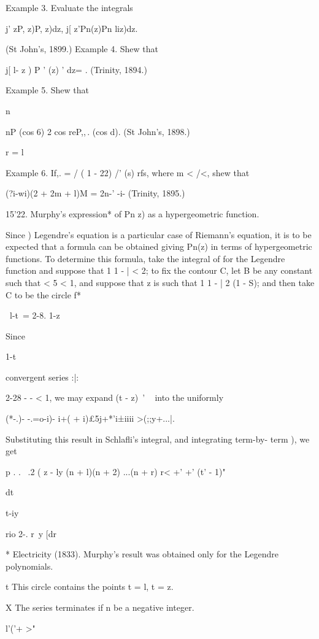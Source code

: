 {{Example 3. Evaluate the integrals

j' zP, z)P, z)dz, j[ z'Pn(z)Pn liz)dz.

(St John's, 1899.) Example 4. Shew that

j[ l- z ) P ' (z) ' dz= . (Trinity, 1894.)

Example 5. Shew that

n

nP (cos 6) 2 cos reP,,\,. (cos d). (St John's, 1898.)

r = l

Example 6. If,. = / ( 1 - 22) /' (s) rfs, where m < /<, shew that

(?i-wi)(2 + 2m + l)M = 2n-' -i- (Trinity, 1895.)

15'22. Murphy's expression* of Pn z) as a hypergeometric function.

Since ) Legendre's equation is a particular case of Riemann's
equation, it is to be expected that a formula can be obtained giving
Pn(z) in terms of hypergeometric functions. To determine this formula,
take the integral of for the Legendre function and suppose that
1 1 - | < 2; to fix the contour C, let B be any constant such that <
5 < 1, and suppose that z is such that 1 1 - | 2 (1 - S); and then
take C to be the circle f*

\ l-t\ = 2-8. 1-z

Since

1-t

convergent series :|:

2-28 - - < 1, we may expand (t - z)~' ~ into the uniformly

(*-.)- -.=o-i)- i+( + i)£5j+*'i±iiii >(;;y+...|.

Substituting this result in Schlafli's integral, and integrating
term-by- term ), we get

p . . \ .2 ( z - ly (n + l)(n + 2) ...(n + r) r< +' +' (t' - 1)"

dt

 t-iy

rio 2-. r\ y [dr

* Electricity (1833). Murphy's result was obtained only for the
Legendre polynomials.

t This circle contains the points t = l, t = z.

X The series terminates if n be a negative integer.

l'('+ >"

%
%

}}
